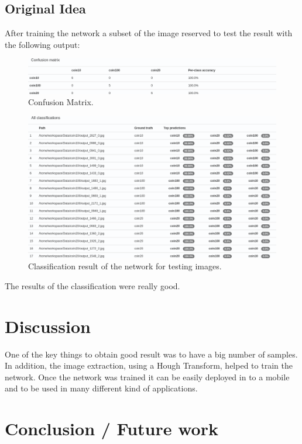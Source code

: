 \documentclass[10pt,journal,compsoc]{IEEEtran}
\begin{document}
\subsection{Original Idea}

After training the network a subset of the image reserved to test the result with the following output:

\begin{figure}[h]
\centering
\includegraphics[scale=0.2]{confusion-matrix}
\caption{Confusion Matrix.}
\label{fig:figure5}
\end{figure}


\begin{figure}[h]
\centering
\includegraphics[scale=0.2]{classification-all}
\caption{Classification result of the network for testing images.}
\label{fig:figure6}
\end{figure}

The results of the classification were really good. 

\section{Discussion}

One of the key things to obtain good result was to have a big number of samples. In addition, the image extraction, using a Hough Transform, helped to train the network. Once the network was trained it can be easily deployed in to a mobile and to be used in many different kind of applications.

	
\section{Conclusion / Future work}
\end{document}
